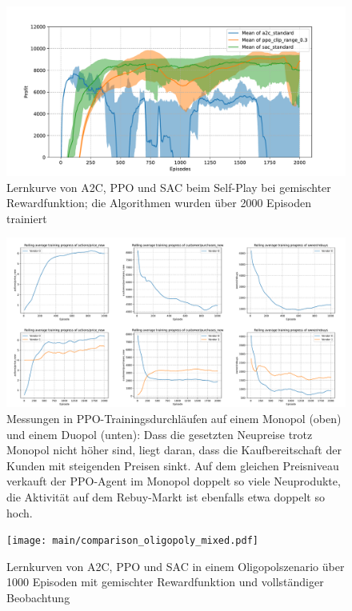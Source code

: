\begin{figure}[htbp]
	\centering
	\includegraphics[width=\textwidth]{appendix/self_play_mixed.pdf}
	\caption{Lernkurve von A2C, PPO und SAC beim Self-Play bei gemischter Rewardfunktion; die Algorithmen wurden über 2000 Episoden trainiert}
	\label{graphic:SelfPlayMixedLearningCurve}
\end{figure}
\begin{figure}[htbp]
	\centering
	\includegraphics[width=\textwidth]{appendix/ppo_monopoly_vs_doupoly.pdf}
	\caption{
		Messungen in PPO-Trainingsdurchläufen auf einem Monopol (oben) und einem Duopol (unten):
		Dass die gesetzten Neupreise trotz Monopol nicht höher sind, liegt daran, dass die Kaufbereitschaft der Kunden mit steigenden Preisen sinkt.
		Auf dem gleichen Preisniveau verkauft der PPO-Agent im Monopol doppelt so viele Neuprodukte, die Aktivität auf dem Rebuy-Markt ist ebenfalls etwa doppelt so hoch.
	}
	\label{graphic:PPOMonopolyDuopoly}
\end{figure}
\begin{figure}[htbp]
	\centering
	\texttt{[image: main/comparison\_oligopoly\_mixed.pdf]}
	\caption{Lernkurven von A2C, PPO und SAC in einem Oligopolszenario über 1000 Episoden mit gemischter Rewardfunktion und vollständiger Beobachtung}
	\label{graphic:OligopolyMixedComparison}
\end{figure}